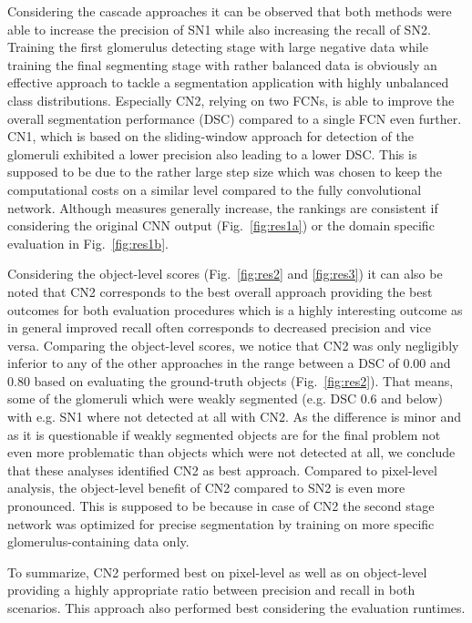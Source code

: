 \documentclass{elsarticle}
\begin{document}
Considering the cascade approaches it can be observed that both methods were able to increase the precision of SN1 while also increasing the recall of SN2. Training the first glomerulus detecting stage with large negative data while training the final segmenting stage with rather balanced data is obviously an effective approach to tackle a segmentation application with highly unbalanced class distributions.
Especially CN2, relying on two FCNs, is able to improve the overall segmentation performance (DSC) compared to a single FCN even further.
CN1, which is based on the sliding-window approach for detection of the glomeruli exhibited a lower precision also leading to a lower DSC. This is supposed to be due to the rather large step size which was chosen to keep the computational costs on a similar level compared to the fully convolutional network.
%
Although measures generally increase, the rankings are consistent if considering the original CNN output (Fig.~\ref{fig:res1a}) or the domain specific evaluation in Fig.~\ref{fig:res1b}. 

Considering the object-level scores (Fig.~\ref{fig:res2} and \ref{fig:res3}) it can also be noted that CN2 corresponds to the best overall approach providing the best outcomes for both evaluation procedures which is a highly interesting outcome as in general improved recall often corresponds to decreased precision and vice versa.
Comparing the object-level scores, we notice that CN2 was only negligibly inferior to any of the other approaches in the range between a DSC of 0.00 and 0.80 based on evaluating the ground-truth objects (Fig.~\ref{fig:res2}).
That means, some of the glomeruli which were weakly segmented (e.g. DSC 0.6 and below) with e.g. SN1 where not detected at all with CN2.
As the difference is minor and as it is questionable if weakly segmented objects are for the final problem not even more problematic than objects which were not detected at all, we conclude that these analyses identified CN2 as best approach.
%
Compared to pixel-level analysis, the object-level benefit of CN2 compared to SN2 is even more pronounced. This is supposed to be because in case of CN2 the second stage network was optimized for precise segmentation by training on more specific glomerulus-containing data only. 

To summarize, CN2 performed best on pixel-level as well as on object-level providing a highly appropriate ratio between precision and recall in both scenarios.
This approach also performed best considering the evaluation runtimes.
\end{document}

